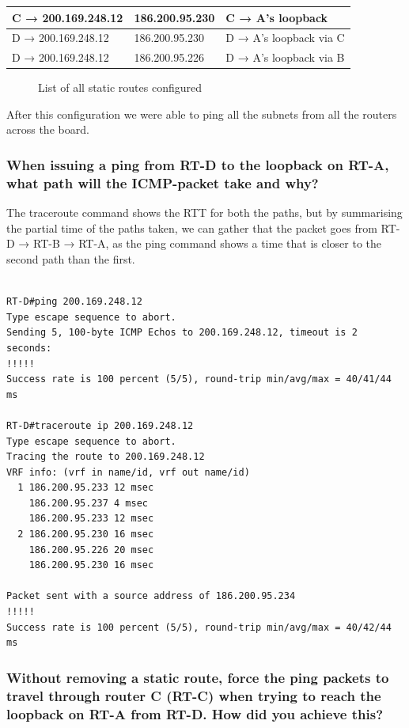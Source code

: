 \documentclass[a4paper, titlepage,12pt]{article}
\begin{document}
\begin{center}
\begin{longtable}{|l|l|l|}
			\hline
			C → 200.169.248.12 & 186.200.95.230 & C →  A’s loopback \\
			\hline
			D → 200.169.248.12 & 186.200.95.230 & D →  A’s loopback via C \\
			\hline
			D → 200.169.248.12 & 186.200.95.226 & D →  A’s loopback via B \\
			\hline
		\end{longtable}
		\begin{figure}[H]
		\caption{List of all static routes configured}
		\end{figure}
	\end{center}

		After this configuration we were able to ping all the subnets from all the routers across the board.

		\subsubsection{When issuing a ping from RT-D to the loopback on RT-A, what path will the ICMP-packet take and why?}

		The traceroute command shows the RTT for both the paths, but by summarising the partial time of the paths taken, we can gather that the packet goes from RT-D → RT-B → RT-A, as the ping command shows a time that is closer to the second path than the first.

\begin{verbatim}

RT-D#ping 200.169.248.12
Type escape sequence to abort.
Sending 5, 100-byte ICMP Echos to 200.169.248.12, timeout is 2 seconds:
!!!!!
Success rate is 100 percent (5/5), round-trip min/avg/max = 40/41/44 ms

RT-D#traceroute ip 200.169.248.12
Type escape sequence to abort.
Tracing the route to 200.169.248.12
VRF info: (vrf in name/id, vrf out name/id)
  1 186.200.95.233 12 msec
    186.200.95.237 4 msec
    186.200.95.233 12 msec
  2 186.200.95.230 16 msec
    186.200.95.226 20 msec
    186.200.95.230 16 msec

Packet sent with a source address of 186.200.95.234
!!!!!
Success rate is 100 percent (5/5), round-trip min/avg/max = 40/42/44 ms

\end{verbatim}

		\subsubsection{Without removing a static route, force the ping packets to travel through router C (RT-C) when trying to reach the loopback on RT-A from RT-D. How did you achieve this?}
\end{document}
